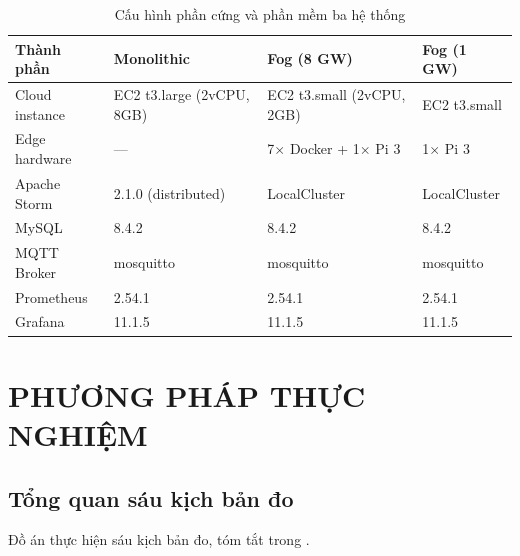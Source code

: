 \documentclass[13pt,a4paper]{report}
\begin{document}
\begin{table}[H]
\centering
\caption{Cấu hình phần cứng và phần mềm ba hệ thống}
\label{tab:config}
\small
\begin{tabular}{p{} p{} p{} p{}}
\toprule
\textbf{Thành phần} & \textbf{Monolithic} & \textbf{Fog (8 GW)} & \textbf{Fog (1 GW)} \\
\midrule
Cloud instance & EC2 t3.large (2vCPU, 8GB) & EC2 t3.small (2vCPU, 2GB) & EC2 t3.small \\
Edge hardware  & ---                       & 7$\times$ Docker + 1$\times$ Pi 3 & 1$\times$ Pi 3 \\
Apache Storm   & 2.1.0 (distributed)       & LocalCluster             & LocalCluster \\
MySQL          & 8.4.2                     & 8.4.2                    & 8.4.2 \\
MQTT Broker    & mosquitto                 & mosquitto                & mosquitto \\
Prometheus     & 2.54.1                    & 2.54.1                   & 2.54.1 \\
Grafana        & 11.1.5                    & 11.1.5                   & 11.1.5 \\
\bottomrule
\end{tabular}
\end{table}

\chapter{PHƯƠNG PHÁP THỰC NGHIỆM}
\label{ch:phuongphap}

\section{Tổng quan sáu kịch bản đo}

Đồ án thực hiện sáu kịch bản đo, tóm tắt trong .
\end{document}
